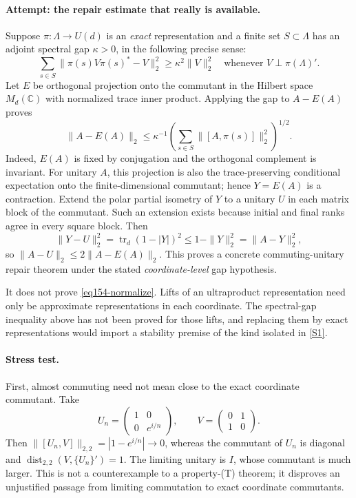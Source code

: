 \documentclass[11pt,a4paper]{article}
\newcommand{\C}{\mathbb{C}}
\newcommand{\sref}[2]{\hyperlink{source:#1:#2}{[S#2]}}
\numberwithin{equation}{section}
\begin{document}
\paragraph{Attempt: the repair estimate that really is available.}
Suppose $\pi:\Lambda\to U(d)$ is an \emph{exact} representation and a finite
set $S\subset\Lambda$ has an adjoint spectral gap $\kappa>0$, in the
following precise sense:
\[
 \sum_{s\in S}\|\pi(s)V\pi(s)^*-V\|_2^2
 \ge\kappa^2\|V\|_2^2
 \quad\text{whenever }V\perp\pi(\Lambda)'.
\]
Let $E$ be orthogonal projection onto the commutant in the Hilbert space
$M_d(\C)$ with normalized trace inner product. Applying the gap to $A-E(A)$
proves
\begin{equation}\label{eq154-gap}
 \|A-E(A)\|_2\le\kappa^{-1}
 \left(\sum_{s\in S}\|[A,\pi(s)]\|_2^2\right)^{1/2}.
\end{equation}
Indeed, $E(A)$ is fixed by conjugation and the orthogonal complement is
invariant. For unitary $A$, this projection is also the trace-preserving
conditional expectation onto the finite-dimensional commutant; hence
$Y=E(A)$ is a contraction. Extend the polar partial isometry of $Y$ to a
unitary $U$ in each matrix block of the commutant. Such an extension exists
because initial and final ranks agree in every square block. Then
\[
 \|Y-U\|_2^2=\operatorname{tr}_d(1-|Y|)^2
 \le1-\|Y\|_2^2=\|A-Y\|_2^2,
\]
so $\|A-U\|_2\le2\|A-E(A)\|_2$.
This proves a concrete commuting-unitary repair theorem under the stated
\emph{coordinate-level} gap hypothesis.

It does not prove \eqref{eq154-normalize}. Lifts of an ultraproduct
representation need only be approximate representations in each coordinate.
The spectral-gap inequality above has not been proved for those lifts, and
replacing them by exact representations would import a stability premise of
the kind isolated in \sref{154}{1}.

\paragraph{Stress test.}
First, almost commuting need not mean close to the exact coordinate
commutant. Take
\[
 U_n=\begin{pmatrix}1&0\\0&e^{i/n}\end{pmatrix},\qquad
 V=\begin{pmatrix}0&1\\1&0\end{pmatrix}.
\]
Then $\|[U_n,V]\|_{2,2}=|1-e^{i/n}|\to0$, whereas the commutant of $U_n$
is diagonal and $\operatorname{dist}_{2,2}(V,\{U_n\}')=1$. The limiting
unitary is $I$, whose commutant is much larger. This is not a counterexample
to a property-(T) theorem; it disproves an unjustified passage from limiting
commutation to exact coordinate commutants.
\end{document}

